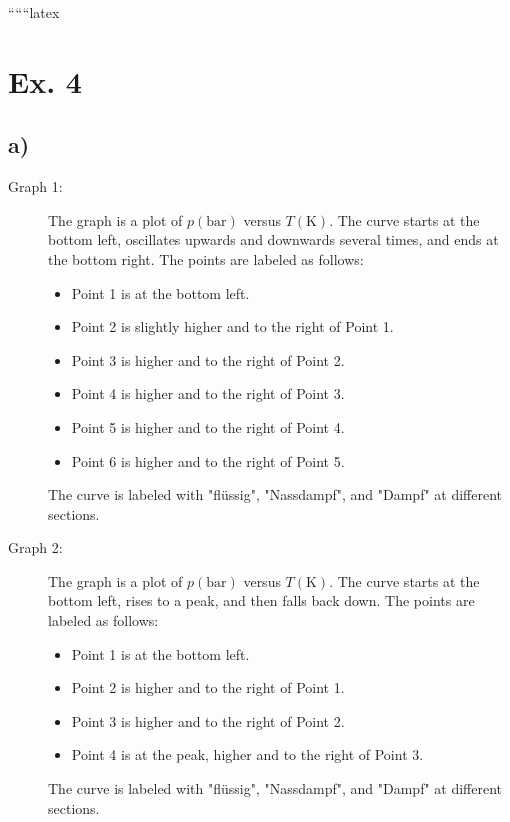 
``````latex


\section*{Ex. 4}

\subsection*{a)}

\begin{description}
    \item[Graph 1:] The graph is a plot of \( p(\text{bar}) \) versus \( T(\text{K}) \). The curve starts at the bottom left, oscillates upwards and downwards several times, and ends at the bottom right. The points are labeled as follows:
    \begin{itemize}
        \item Point 1 is at the bottom left.
        \item Point 2 is slightly higher and to the right of Point 1.
        \item Point 3 is higher and to the right of Point 2.
        \item Point 4 is higher and to the right of Point 3.
        \item Point 5 is higher and to the right of Point 4.
        \item Point 6 is higher and to the right of Point 5.
    \end{itemize}
    The curve is labeled with "flüssig", "Nassdampf", and "Dampf" at different sections.
\end{description}

\begin{description}
    \item[Graph 2:] The graph is a plot of \( p(\text{bar}) \) versus \( T(\text{K}) \). The curve starts at the bottom left, rises to a peak, and then falls back down. The points are labeled as follows:
    \begin{itemize}
        \item Point 1 is at the bottom left.
        \item Point 2 is higher and to the right of Point 1.
        \item Point 3 is higher and to the right of Point 2.
        \item Point 4 is at the peak, higher and to the right of Point 3.
    \end{itemize}
    The curve is labeled with "flüssig", "Nassdampf", and "Dampf" at different sections.
\end{description}

